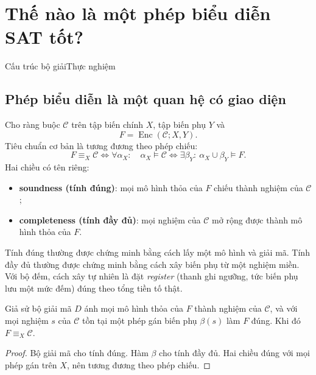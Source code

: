 \chapter{Thế nào là một phép biểu diễn SAT tốt?}


  {Cấu trúc bộ giải}{Thực nghiệm}

\section{Phép biểu diễn là một quan hệ có giao diện}

Cho ràng buộc \(\mathcal C\) trên tập biến chính \(X\), tập biến phụ \(Y\) và
\[
  F=\operatorname{Enc}(\mathcal C;X,Y).
\]
Tiêu chuẩn cơ bản là tương đương theo phép chiếu:
\[
  F\equiv_X\mathcal C
  \iff
  \forall\alpha_X:\quad
  \alpha_X\models\mathcal C
  \Longleftrightarrow
  \exists\beta_Y:\ \alpha_X\cup\beta_Y\models F.
\]
Hai chiều có tên riêng:
\begin{itemize}
  \item \textbf{soundness (tính đúng)}: mọi mô hình thỏa của \(F\) chiếu thành
        nghiệm của \(\mathcal C\);
  \item \textbf{completeness (tính đầy đủ)}: mọi nghiệm của \(\mathcal C\) mở
        rộng được thành mô hình thỏa của \(F\).
\end{itemize}

Tính đúng thường được chứng minh bằng cách lấy một mô hình \CNF và giải mã.
Tính đầy đủ thường được chứng minh bằng cách xây biến phụ từ một nghiệm miền.
Với bộ đếm, cách xây tự nhiên là đặt \emph{register} (thanh ghi ngưỡng, tức
biến phụ lưu một mức đếm) đúng theo tổng tiền tố thật.

\begin{proposition}
Giả sử bộ giải mã \(D\) ánh mọi mô hình thỏa của \(F\) thành nghiệm của
\(\mathcal C\), và với mọi nghiệm \(s\) của \(\mathcal C\) tồn tại một phép gán biến phụ
\(\beta(s)\) làm \(F\) đúng. Khi đó \(F\equiv_X\mathcal C\).
\end{proposition}

\begin{proof}
Bộ giải mã cho tính đúng. Hàm \(\beta\) cho tính đầy đủ. Hai chiều đúng với
mọi phép gán trên \(X\), nên tương đương theo phép chiếu.
\end{proof}

